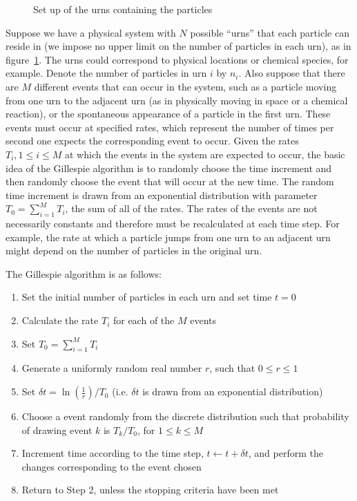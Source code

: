 \documentclass[a4paper,11pt]{report}
\numberwithin{equation}{section}
\begin{document}
\begin{figure}[ht!]
    \centering
    {
    }
    \caption{\label{fig:urns}Set up of the urns containing the particles}
\end{figure}

Suppose we have a physical system with \(N\) possible ``urns'' that each
particle can reside in (we impose no upper limit on the number of particles in
each urn), as in figure~\ref{fig:urns}. The urns could correspond to physical
locations or chemical species, for example. Denote the number of particles in
urn \(i\) by \(n_i\). Also suppose that there are \(M\) different events that
can occur in the system, such as a particle moving from one urn to the adjacent
urn (as in physically moving in space or a chemical reaction), or the
spontaneous appearance of a particle in the first urn. These events must occur
at specified rates, which represent the number of times per second one expects
the corresponding event to occur.  Given the rates \(T_i, 1 \le i \le M\) at
which the events in the system are expected to occur, the basic idea of the
Gillespie algorithm is to randomly choose the time increment and then randomly
choose the event that will occur at the new time. The random time increment is
drawn from an exponential distribution with parameter \(T_0 = \sum_{i=1}^M
T_i\), the sum of all of the rates. The rates of the events are not necessarily
constants and therefore must be recalculated at each time step. For example, the
rate at which a particle jumps from one urn to an adjacent urn might depend on
the number of particles in the original urn.

The Gillespie algorithm is as follows:
\begin{enumerate}
    \item Set the initial number of particles in each urn and set time \(t=0\)
    \item Calculate the rate \(T_i\) for each of the \(M\) events
    \item Set \(T_0 = \sum_{i=1}^M T_i\)
    \item Generate a uniformly random real number \(r\), such that \(0 \le r \le 1\)
    \item Set \(\delta t = \ln\left(\frac{1}{r}\right)/T_0\) (i.e. \(\delta t\)
        is drawn from an exponential distribution)
    \item Choose a event randomly from the discrete distribution such that
        probability of drawing event \(k\) is \(T_k/T_0\), for \(1 \le k \le
        M\)
    \item Increment time according to the time step, \(t \leftarrow t + \delta
        t\), and perform the changes corresponding to the event chosen
    \item Return to Step 2, unless the stopping criteria have been met
\end{enumerate}
\end{document}
